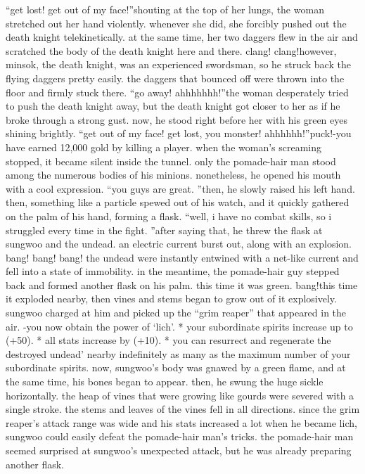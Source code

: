 “get lost! get out of my face!”shouting at the top of her lungs, the woman stretched out her hand violently.
 whenever she did, she forcibly pushed out the death knight telekinetically.
 at the same time, her two daggers flew in the air and scratched the body of the death knight here and there.
clang! clang!however, minsok, the death knight, was an experienced swordsman, so he struck back the flying daggers pretty easily.
 the daggers that bounced off were thrown into the floor and firmly stuck there.
“go away! ahhhhhhh!”the woman desperately tried to push the death knight away, but the death knight got closer to her as if he broke through a strong gust.
 now, he stood right before her with his green eyes shining brightly.
“get out of my face! get lost, you monster! ahhhhhh!”puck!-you have earned 12,000 gold by killing a player.
when the woman’s screaming stopped, it became silent inside the tunnel.
only the pomade-hair man stood among the numerous bodies of his minions.
nonetheless, he opened his mouth with a cool expression.
“you guys are great.
”then, he slowly raised his left hand.
 then, something like a particle spewed out of his watch, and it quickly gathered on the palm of his hand, forming a flask.
“well, i have no combat skills, so i struggled every time in the fight.
”after saying that, he threw the flask at sungwoo and the undead.
 an electric current burst out, along with an explosion.
bang! bang! bang!
the undead were instantly entwined with a net-like current and fell into a state of immobility.
 in the meantime, the pomade-hair guy stepped back and formed another flask on his palm.
 this time it was green.
bang!this time it exploded nearby, then vines and stems began to grow out of it explosively.
 sungwoo charged at him and picked up the “grim reaper” that appeared in the air.
-you now obtain the power of ‘lich’.
* your subordinate spirits increase up to (+50).
* all stats increase by (+10).
* you can resurrect and regenerate the destroyed undead’ nearby indefinitely as many as the maximum number of your subordinate spirits.
now, sungwoo’s body was gnawed by a green flame, and at the same time, his bones began to appear.
 then, he swung the huge sickle horizontally.
the heap of vines that were growing like gourds were severed with a single stroke.
 the stems and leaves of the vines fell in all directions.
since the grim reaper’s attack range was wide and his stats increased a lot when he became lich, sungwoo could easily defeat the pomade-hair man’s tricks.
the pomade-hair man seemed surprised at sungwoo’s unexpected attack, but he was already preparing another flask.
